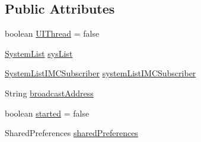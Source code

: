 \subsection*{Public Attributes}
\begin{DoxyCompactItemize}
\item 
boolean \hyperlink{classpt_1_1lsts_1_1asa_1_1ASA_af45cdf877804002113beca9a8c497e4e}{U\+I\+Thread} = false
\item 
\hyperlink{classpt_1_1lsts_1_1asa_1_1sys_1_1SystemList}{System\+List} \hyperlink{classpt_1_1lsts_1_1asa_1_1ASA_a7d9323dbee5f882abe734625c536158b}{sys\+List}
\item 
\hyperlink{classpt_1_1lsts_1_1asa_1_1subscribers_1_1SystemListIMCSubscriber}{System\+List\+I\+M\+C\+Subscriber} \hyperlink{classpt_1_1lsts_1_1asa_1_1ASA_a62b74f0d8e70e3c48956556b4a059c7a}{system\+List\+I\+M\+C\+Subscriber}
\item 
String \hyperlink{classpt_1_1lsts_1_1asa_1_1ASA_aa9bbbbc42eb2b87d06a8a6cf3fcc7c96}{broadcast\+Address}
\item 
boolean \hyperlink{classpt_1_1lsts_1_1asa_1_1ASA_a6ed3c06b1580866836c2d0d39ae8c643}{started} = false
\item 
Shared\+Preferences \hyperlink{classpt_1_1lsts_1_1asa_1_1ASA_a7ba8cb6b6565d074dce7b016da83d1ba}{shared\+Preferences}
\end{DoxyCompactItemize}
